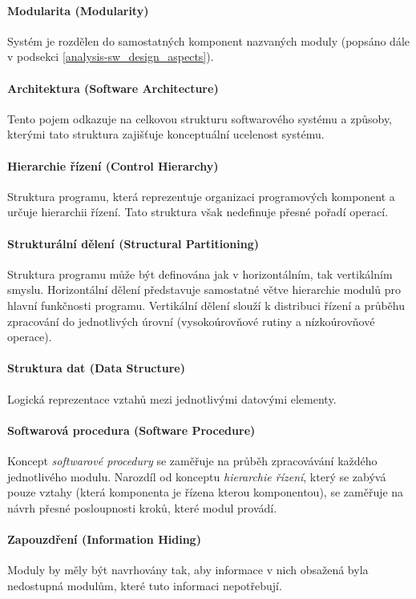 \paragraph{Modularita (Modularity)} Systém je rozdělen do samostatných komponent nazvaných moduly (popsáno dále v podsekci \ref{analysis-sw_design_aspects}).

\paragraph{Architektura (Software Architecture)} Tento pojem odkazuje na celkovou strukturu softwarového systému a způsoby, kterými tato struktura zajišťuje konceptuální ucelenost systému.

\paragraph{Hierarchie řízení (Control Hierarchy)} Struktura programu, která reprezentuje organizaci programových komponent a určuje hierarchii řízení. Tato struktura však nedefinuje přesné pořadí operací.

\paragraph{Strukturální dělení (Structural Partitioning)} Struktura programu může být definována jak v horizontálním, tak vertikálním smyslu. Horizontální dělení představuje samostatné větve hierarchie modulů pro hlavní funkčnosti programu. Vertikální dělení slouží k distribuci řízení a průběhu zpracování do jednotlivých úrovní (vysokoúrovňové rutiny a nízkoúrovňové operace).

\paragraph{Struktura dat (Data Structure)} Logická reprezentace vztahů mezi jednotlivými datovými elementy.

\paragraph{Softwarová procedura (Software Procedure)} Koncept \emph{softwarové procedury} se zaměřuje na průběh zpracovávání každého jednotlivého modulu. Narozdíl od konceptu \emph{hierarchie řízení}, který se zabývá pouze vztahy (která komponenta je řízena kterou komponentou), se zaměřuje na návrh přesné posloupnosti kroků, které modul provádí.

\paragraph{Zapouzdření (Information Hiding)} Moduly by měly být navrhovány tak, aby informace v nich obsažená byla nedostupná modulům, které tuto informaci nepotřebují.

